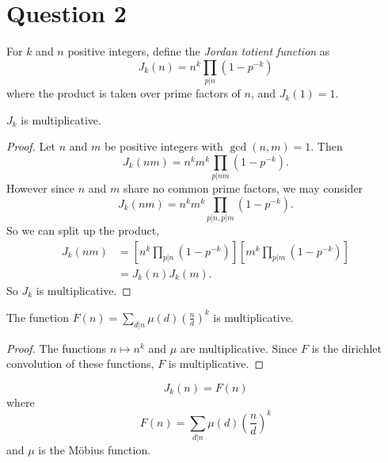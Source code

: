\documentclass{unswmaths}
\begin{document}
\section*{Question 2}
\begin{definition}
    For $k$ and $n$ positive integers, define the \emph{Jordan totient function} as
    \begin{equation*}
        J_k(n) = n^k\prod_{p|n} (1-p^{-k})
    \end{equation*}
    where the product is taken over prime factors of $n$, and $J_k(1) = 1$.
\end{definition}
\begin{lemma}
    $J_k$ is multiplicative.
\end{lemma}
\begin{proof}
    Let $n$ and $m$ be positive integers with $\gcd(n,m) = 1$. Then
    \begin{equation*}
        J_k(nm) = n^km^k\prod_{p|nm}(1-p^{-k}).
    \end{equation*}
    However since $n$ and $m$ share no common prime factors, we may consider
    \begin{equation*}
        J_k(nm) = n^km^k\prod_{p|n,p|m} (1-p^{-k}).
    \end{equation*}
    So we can split up the product,
    \begin{align*}
        J_k(nm) &= \left[n^k\prod_{p|n}(1-p^{-k})\right]\left[m^k\prod_{p|m}(1-p^{-k})\right]\\
        &= J_k(n)J_k(m).
    \end{align*}
    So $J_k$ is multiplicative.
\end{proof}
\begin{lemma}
    The function $F(n) = \sum_{d|n}\mu(d)\left(\frac{n}{d}\right)^k$ is multiplicative. 
\end{lemma}
\begin{proof}
    The functions $n\mapsto n^k$ and $\mu$ are multiplicative.
    Since $F$ is the dirichlet convolution of these functions, $F$
    is multiplicative.    
\end{proof}
\begin{theorem}
    \begin{equation*}
        J_k(n) = F(n)
    \end{equation*}
    where 
    \begin{equation*}
        F(n) = \sum_{d|n} \mu(d)\left(\frac{n}{d}\right)^k
    \end{equation*}
    and $\mu$ is the M\"obius function.
\end{theorem}
\end{document}
